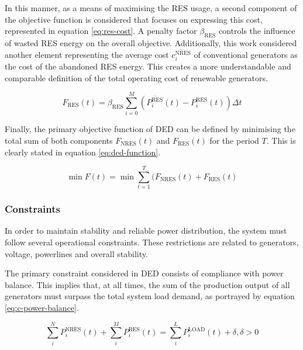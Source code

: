 In this manner, as a means of maximising the \ac{RES} usage, a second component of the objective function is considered that focuses on expressing this cost, represented in equation \ref{eq:res-cost}. A penalty factor $\beta_\text{RES}$ controls the influence of wasted \ac{RES} energy on the overall objective. Additionally, this work considered another element representing the average cost $\overline{c^\text{NRES}_i}$ of conventional generators as the cost of the abandoned \ac{RES} energy. This creates a more understandable and comparable definition of the total operating cost of renewable generators.  \par

\begin{equation} \label{eq:res-cost}
	F_\text{RES}(t) = \beta_\text{RES} \sum^M_{i=0}  (\overline{P^\text{RES}_i}(t) - P^\text{RES}_i(t)) \Delta t 
\end{equation}

Finally, the primary objective function of \ac{DED} can be defined by minimising the total sum of both components $F_\text{NRES}(t)$ and $F_\text{RES}(t)$ for the period $T$. This is clearly stated in equation \ref{eq:ded-function}.

\begin{equation} \label{eq:ded-function}
	\min F (t) =  \min\sum^T_{t=1}(F_\text{NRES}(t) + F_{\text{RES}}(t)
\end{equation}

\subsubsection{Constraints} \label{sec:constraints}

In order to maintain stability and reliable power distribution, the system must follow several operational constraints. These restrictions are related to generators, voltage, powerlines and overall stability.  \par

The primary constraint considered in \ac{DED} consists of compliance with power balance. This implies that, at all times, the sum of the production output of all generators must surpass the total system load demand, as portrayed by equation \ref{eq:c-power-balance}. 

\begin{equation} \label{eq:c-power-balance}
	\sum^N_i P^\text{NRES}_i(t) + \sum^M_i P^\text{RES}_i(t) = \sum^L_i P^\text{LOAD}_i(t) + \delta, \delta > 0
\end{equation}

